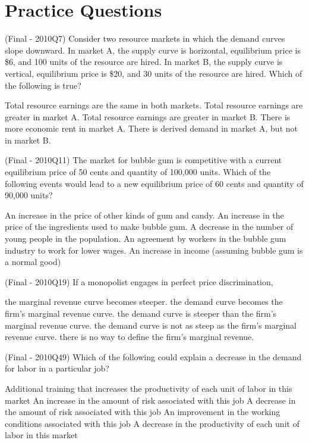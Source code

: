 \documentclass{exam}
\begin{document}
\section{Practice Questions}

\begin{questions}

\question (Final - 2010Q7) Consider two resource markets in which the demand curves slope downward. In market A, the supply curve is horizontal, 
equilibrium price is \$6, and 100 units of the resource are hired. In market B, the supply curve is vertical, equilibrium price is \$20, and 30 units of the resource are hired. Which of the following is true?
\begin{choices}
\CorrectChoice Total resource earnings are the same in both markets.
\choice Total resource earnings are greater in market A.
\choice Total resource earnings are greater in market B.
\choice There is more economic rent in market A.
\choice There is derived demand in market A, but not in market B.
\end{choices}

\question (Final - 2010Q11) The market for bubble gum is competitive with a current equilibrium price of 50 cents and quantity of 100,000 units. Which of the following events would lead to a new equilibrium price of 60 cents and quantity of 90,000 units? 
\begin{choices}
\choice An increase in the price of other kinds of gum and candy.
\CorrectChoice An increase in the price of the ingredients used to make bubble gum.
\choice A decrease in the number of young people in the population.
\choice An agreement by workers in the bubble gum industry to work for lower wages.
\choice An increase in income (assuming bubble gum is a normal good)
\end{choices}

\question (Final - 2010Q19) If a monopolist engages in perfect price discrimination,
\begin{choices}
\choice the marginal revenue curve becomes steeper.
\CorrectChoice the demand curve becomes  the firm's marginal revenue curve.
\choice the demand curve is steeper than the firm's marginal revenue curve.
\choice the demand curve is not as steep as the firm's marginal revenue curve.
\choice there is no way to define the firm's marginal revenue.
\end{choices}

\question (Final - 2010Q49) Which of the following could explain a decrease in the demand for labor in a particular job?
\begin{choices}
\choice Additional training that increases the productivity of each unit of labor in this market 
\choice An increase in the amount of risk associated with this job 
\choice A decrease in the amount of risk associated with this job 
\choice An improvement in the working conditions associated with this job 
\CorrectChoice A decrease in the productivity of each unit of labor in this market 
\end{choices}


\end{questions}
\end{document}
